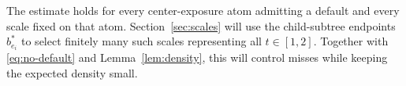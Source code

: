 The estimate holds for every center-exposure atom admitting a default
and every scale fixed on that atom. Section~\ref{sec:scales} will use
the child-subtree endpoints \(b_{e_i}^*\) to select finitely many such
scales representing all \(t\in[1,2]\). Together with
\eqref{eq:no-default} and Lemma~\ref{lem:density}, this will control
misses while keeping the expected density small.
